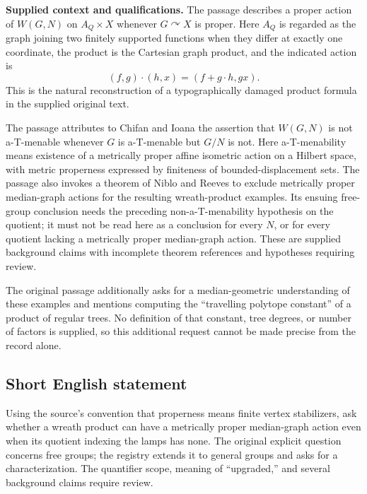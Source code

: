 \documentclass[11pt]{article}
\begin{document}
\textbf{Supplied context and qualifications.} The passage describes a proper action of \(W(G,N)\) on \(A_Q\times X\) whenever \(G\curvearrowright X\) is proper. Here \(A_Q\) is regarded as the graph joining two finitely supported functions when they differ at exactly one coordinate, the product is the Cartesian graph product, and the indicated action is
\[
(f,g)\cdot(h,x)=(f+g\cdot h,gx).
\]
This is the natural reconstruction of a typographically damaged product formula in the supplied original text.

The passage attributes to Chifan and Ioana the assertion that \(W(G,N)\) is not a-T-menable whenever \(G\) is a-T-menable but \(G/N\) is not. Here a-T-menability means existence of a metrically proper affine isometric action on a Hilbert space, with metric properness expressed by finiteness of bounded-displacement sets. The passage also invokes a theorem of Niblo and Reeves to exclude metrically proper median-graph actions for the resulting wreath-product examples. Its ensuing free-group conclusion needs the preceding non-a-T-menability hypothesis on the quotient; it must not be read here as a conclusion for every \(N\), or for every quotient lacking a metrically proper median-graph action. These are supplied background claims with incomplete theorem references and hypotheses requiring review.

The original passage additionally asks for a median-geometric understanding of these examples and mentions computing the ``travelling polytope constant'' of a product of regular trees. No definition of that constant, tree degrees, or number of factors is supplied, so this additional request cannot be made precise from the record alone.
\subsection{Short English statement}
Using the source's convention that properness means finite vertex stabilizers, ask whether a wreath product can have a metrically proper median-graph action even when its quotient indexing the lamps has none. The original explicit question concerns free groups; the registry extends it to general groups and asks for a characterization. The quantifier scope, meaning of ``upgraded,'' and several background claims require review.
\end{document}
